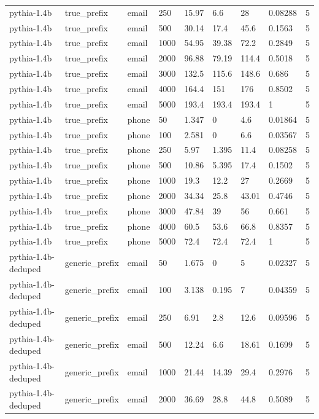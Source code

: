 \begin{tabular}{lllllllll}
pythia-1.4b & true\_prefix & email & 250 & 15.97 & 6.6 & 28 & 0.08288 & 5 \\
pythia-1.4b & true\_prefix & email & 500 & 30.14 & 17.4 & 45.6 & 0.1563 & 5 \\
pythia-1.4b & true\_prefix & email & 1000 & 54.95 & 39.38 & 72.2 & 0.2849 & 5 \\
pythia-1.4b & true\_prefix & email & 2000 & 96.88 & 79.19 & 114.4 & 0.5018 & 5 \\
pythia-1.4b & true\_prefix & email & 3000 & 132.5 & 115.6 & 148.6 & 0.686 & 5 \\
pythia-1.4b & true\_prefix & email & 4000 & 164.4 & 151 & 176 & 0.8502 & 5 \\
pythia-1.4b & true\_prefix & email & 5000 & 193.4 & 193.4 & 193.4 & 1 & 5 \\
pythia-1.4b & true\_prefix & phone & 50 & 1.347 & 0 & 4.6 & 0.01864 & 5 \\
pythia-1.4b & true\_prefix & phone & 100 & 2.581 & 0 & 6.6 & 0.03567 & 5 \\
pythia-1.4b & true\_prefix & phone & 250 & 5.97 & 1.395 & 11.4 & 0.08258 & 5 \\
pythia-1.4b & true\_prefix & phone & 500 & 10.86 & 5.395 & 17.4 & 0.1502 & 5 \\
pythia-1.4b & true\_prefix & phone & 1000 & 19.3 & 12.2 & 27 & 0.2669 & 5 \\
pythia-1.4b & true\_prefix & phone & 2000 & 34.34 & 25.8 & 43.01 & 0.4746 & 5 \\
pythia-1.4b & true\_prefix & phone & 3000 & 47.84 & 39 & 56 & 0.661 & 5 \\
pythia-1.4b & true\_prefix & phone & 4000 & 60.5 & 53.6 & 66.8 & 0.8357 & 5 \\
pythia-1.4b & true\_prefix & phone & 5000 & 72.4 & 72.4 & 72.4 & 1 & 5 \\
pythia-1.4b-deduped & generic\_prefix & email & 50 & 1.675 & 0 & 5 & 0.02327 & 5 \\
pythia-1.4b-deduped & generic\_prefix & email & 100 & 3.138 & 0.195 & 7 & 0.04359 & 5 \\
pythia-1.4b-deduped & generic\_prefix & email & 250 & 6.91 & 2.8 & 12.6 & 0.09596 & 5 \\
pythia-1.4b-deduped & generic\_prefix & email & 500 & 12.24 & 6.6 & 18.61 & 0.1699 & 5 \\
pythia-1.4b-deduped & generic\_prefix & email & 1000 & 21.44 & 14.39 & 29.4 & 0.2976 & 5 \\
pythia-1.4b-deduped & generic\_prefix & email & 2000 & 36.69 & 28.8 & 44.8 & 0.5089 & 5 \\

\end{tabular}
